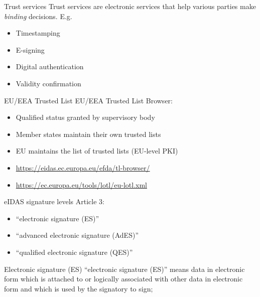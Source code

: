 \begin{frame}{Trust services}
  Trust services are electronic services that help various parties make \emph{binding} decisions.
  E.g.
  \begin{itemize}[<+(1)->]
    \item Timestamping
    \item E-signing
    \item Digital authentication
    \item Validity confirmation
  \end{itemize}
\end{frame}

\begin{frame}{EU/EEA Trusted List}
  EU/EEA Trusted List Browser:
  \begin{itemize}[<+(1)->]
    \item Qualified status granted by supervisory body
    \item Member states maintain their own trusted lists
    \item EU maintains the list of trusted lists (EU-level PKI)
    \item {\scriptsize \url{https://eidas.ec.europa.eu/efda/tl-browser/}}
    \item {\scriptsize \url{https://ec.europa.eu/tools/lotl/eu-lotl.xml}}
  \end{itemize}
\end{frame}

\begin{frame}{eIDAS signature levels}
  Article 3:
  \settowidth{\offset}{10}
  \addtolength{\leftmargini}{\offset}
  \begin{itemize}[<+(1)->]
    \item[(10)] \enquote{electronic signature (ES)}
    \item[(11)] \enquote{advanced electronic signature (AdES)}
    \item[(12)] \enquote{qualified electronic signature (QES)}
  \end{itemize}
\end{frame}

\begin{frame}{Electronic signature (ES)}
  \enquote{electronic signature (ES)} means data in electronic form which is attached to or logically associated with other data in electronic form and which is used by the signatory to sign;
\end{frame}

